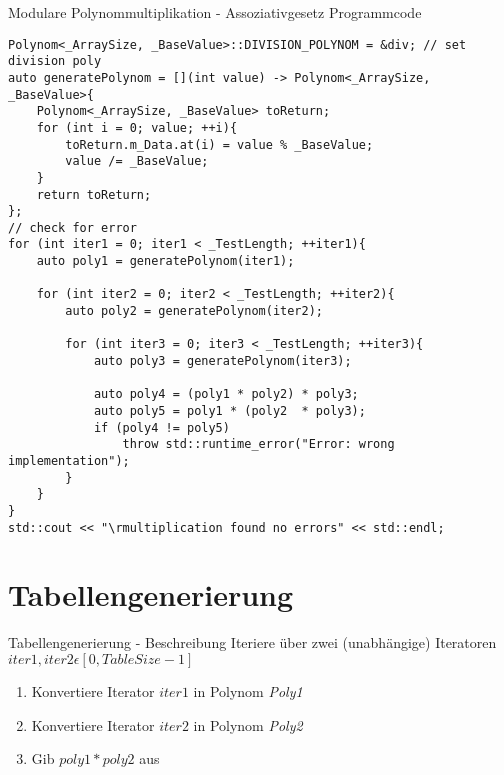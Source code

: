 \documentclass{beamer}
\begin{document}
    \begin{frame}[fragile]{Modulare Polynommultiplikation - \newline Assoziativgesetz Programmcode}
    	\begin{lstlisting}[style=numbers]
Polynom<_ArraySize, _BaseValue>::DIVISION_POLYNOM = &div; // set division poly
auto generatePolynom = [](int value) -> Polynom<_ArraySize, _BaseValue>{
    Polynom<_ArraySize, _BaseValue> toReturn;
    for (int i = 0; value; ++i){
        toReturn.m_Data.at(i) = value % _BaseValue;
        value /= _BaseValue;
    }
    return toReturn;
};
// check for error
for (int iter1 = 0; iter1 < _TestLength; ++iter1){
    auto poly1 = generatePolynom(iter1);

    for (int iter2 = 0; iter2 < _TestLength; ++iter2){
        auto poly2 = generatePolynom(iter2);

        for (int iter3 = 0; iter3 < _TestLength; ++iter3){
            auto poly3 = generatePolynom(iter3);
            
            auto poly4 = (poly1 * poly2) * poly3;
            auto poly5 = poly1 * (poly2  * poly3);
            if (poly4 != poly5)
                throw std::runtime_error("Error: wrong implementation");
        }
    }
}
std::cout << "\rmultiplication found no errors" << std::endl;
\end{lstlisting}
\end{frame}

	\section{Tabellengenerierung}
    \begin{frame}{Tabellengenerierung - \newline Beschreibung}
    	Iteriere über zwei (unabhängige) Iteratoren \newline $iter1, iter2 \epsilon [0, TableSize - 1]$
    	\begin{enumerate}
  	  	\item Konvertiere Iterator $iter1$ in Polynom \textit{Poly1}
  	  	\item Konvertiere Iterator $iter2$ in Polynom \textit{Poly2}
  	  	\item Gib $poly1 * poly2$ aus
  	  	\end{enumerate}
    \end{frame}
    
\end{document}
